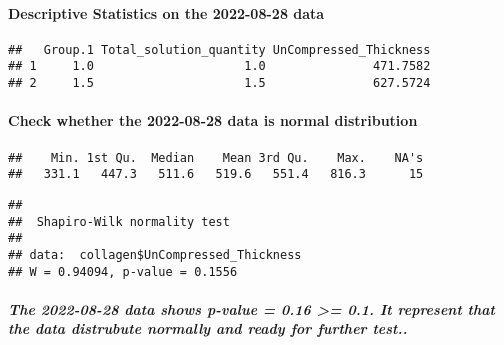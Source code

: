 \documentclass[
]{article}
\newenvironment{Shaded}{\begin{snugshade}}{\end{snugshade}}
\newcommand{\CommentTok}[1]{\textcolor[rgb]{0.56,0.35,0.01}{\textit{#1}}}
\newcommand{\FunctionTok}[1]{\textcolor[rgb]{0.00,0.00,0.00}{#1}}
\newcommand{\NormalTok}[1]{#1}
\newcommand{\OtherTok}[1]{\textcolor[rgb]{0.56,0.35,0.01}{#1}}
\newcommand{\SpecialCharTok}[1]{\textcolor[rgb]{0.00,0.00,0.00}{#1}}
\begin{document}
\hypertarget{descriptive-statistics-on-the-2022-08-28-data}{%
\paragraph{Descriptive Statistics on the 2022-08-28
data}\label{descriptive-statistics-on-the-2022-08-28-data}}

\begin{verbatim}
##   Group.1 Total_solution_quantity UnCompressed_Thickness
## 1     1.0                     1.0               471.7582
## 2     1.5                     1.5               627.5724
\end{verbatim}

\hypertarget{check-whether-the-2022-08-28-data-is-normal-distribution}{%
\paragraph{Check whether the 2022-08-28 data is normal
distribution}\label{check-whether-the-2022-08-28-data-is-normal-distribution}}

\begin{Shaded}
\end{Shaded}

\begin{verbatim}
##    Min. 1st Qu.  Median    Mean 3rd Qu.    Max.    NA's 
##   331.1   447.3   511.6   519.6   551.4   816.3      15
\end{verbatim}

\begin{Shaded}
\end{Shaded}

\begin{verbatim}
## 
##  Shapiro-Wilk normality test
## 
## data:  collagen$UnCompressed_Thickness
## W = 0.94094, p-value = 0.1556
\end{verbatim}

\hypertarget{the-2022-08-28-data-shows-p-value-0.16-0.1.-it-represent-that-the-data-distrubute-normally-and-ready-for-further-test..}{%
\subparagraph{The 2022-08-28 data shows p-value = 0.16 \textgreater=
0.1. It represent that the data distrubute normally and ready for
further
test..}\label{the-2022-08-28-data-shows-p-value-0.16-0.1.-it-represent-that-the-data-distrubute-normally-and-ready-for-further-test..}}
\end{document}
